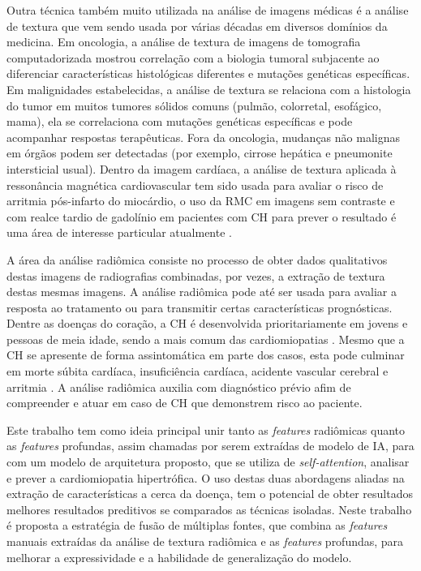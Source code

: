 Outra técnica também muito utilizada na análise de imagens médicas é a análise de textura que vem sendo usada por várias décadas em diversos domínios da medicina. Em oncologia, a análise de textura de imagens de tomografia computadorizada mostrou correlação com a biologia tumoral subjacente ao diferenciar características histológicas diferentes e mutações genéticas específicas. Em malignidades estabelecidas, a análise de textura se relaciona com a histologia do tumor em muitos tumores sólidos comuns (pulmão, colorretal, esofágico, mama), ela se correlaciona com mutações genéticas específicas e pode acompanhar respostas terapêuticas. Fora da oncologia, mudanças não malignas em órgãos podem ser detectadas (por exemplo, cirrose hepática e pneumonite intersticial usual). Dentro da imagem cardíaca, a análise de textura aplicada à ressonância magnética cardiovascular tem sido usada para avaliar o risco de arritmia pós-infarto do miocárdio, o uso da RMC em imagens sem contraste e com realce tardio de gadolínio em pacientes com \gls{CH} para prever o resultado é uma área de interesse particular atualmente \cite{schofieldTextureAnalysisCardiovascular2019a}.

A área da análise radiômica consiste no processo de obter dados qualitativos destas imagens de radiografias combinadas, por vezes, a extração de textura destas mesmas imagens. A análise radiômica pode até ser usada para avaliar a resposta ao tratamento ou para transmitir certas características prognósticas. Dentre as doenças do coração, a \gls{CH} é desenvolvida prioritariamente em jovens e pessoas de meia idade, sendo a mais comum das cardiomiopatias . Mesmo que a \gls{CH} se apresente de forma assintomática em parte dos casos, esta pode culminar em morte súbita cardíaca, insuficiência cardíaca, acidente vascular cerebral e arritmia \cite{kwonComparisonMortalityCause2022}. A análise radiômica auxilia com diagnóstico prévio afim de compreender e atuar em caso de \gls{CH} que demonstrem risco ao paciente.


Este trabalho tem como ideia principal unir tanto as \textit{features} radiômicas quanto as \textit{features} profundas, assim chamadas por serem extraídas de modelo de \gls{IA}, para com um modelo de arquitetura proposto, que se utiliza de \textit{self-attention}, analisar e prever a cardiomiopatia hipertrófica. O uso destas duas abordagens aliadas na extração de características a cerca da doença, tem o potencial de obter resultados melhores resultados preditivos se comparados as técnicas isoladas. Neste trabalho é proposta a estratégia de fusão de múltiplas fontes, que combina as \textit{features} manuais extraídas da análise de textura radiômica e as \textit{features} profundas, para melhorar a expressividade e a habilidade de generalização do modelo.


